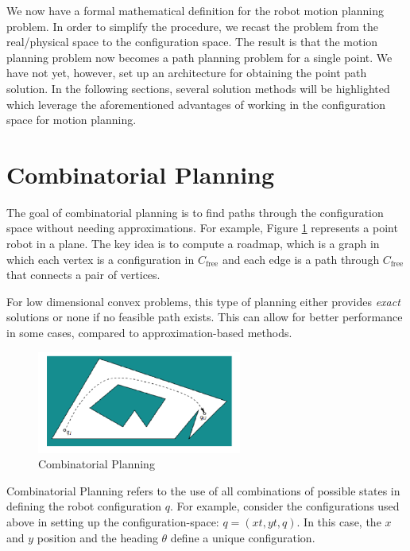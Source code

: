 \documentclass[twoside]{article}
\begin{document}
We now have a formal mathematical definition for the robot motion planning problem. In order to simplify the procedure, we recast the problem from the real/physical space to the configuration space. The result is that the motion planning problem now becomes a path planning problem for a single point. We have not yet, however, set up an architecture for obtaining the point path solution. In the following sections, several solution methods will be highlighted which leverage the aforementioned advantages of working in the configuration space for motion planning.

\section{Combinatorial Planning}
The goal of combinatorial planning is to find paths through the configuration space without needing approximations. For example, Figure \ref{fig:15_4} represents a point robot in a plane. The key idea is to compute a roadmap, which is a graph in which each vertex is a configuration in $C_\text{free}$ and each edge is a path through $C_\text{free}$ that connects a pair of vertices.

For low dimensional convex problems, this type of planning either provides \textit{exact} solutions or none if no feasible path exists. This can allow for better performance in some cases, compared to approximation-based methods.

\begin{figure}[H]
\begin{center}
\includegraphics[width=0.6\textwidth]{fig15_4.PNG}
\caption{Combinatorial Planning}
\label{fig:15_4}
\end{center}
\end{figure}

Combinatorial Planning refers to the use of all combinations of possible states in defining the robot configuration $q$. For example, consider the configurations used above in setting up the configuration-space: $q = (xt, yt, q)$. In this case, the $x$ and $y$ position and the heading $\theta$ define a unique configuration.
\end{document}
